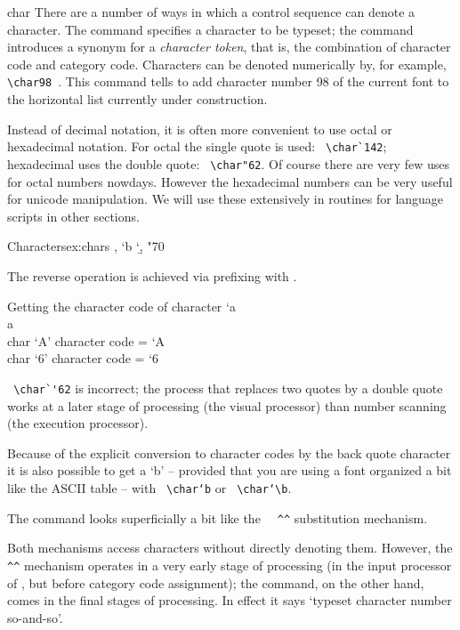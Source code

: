 \begin{docCommand}{char}{}
There are a number of ways in which a control sequence can denote a character. The  command specifies a character to be typeset; the \cmd{\let} command introduces a synonym for a \emph{character
token}, that is, the combination of character code and category code.
\index{\string\char}
Characters can be denoted numerically by, for example, \verb+ \char98 +. This command tells \tex to add
character number 98 of the current font to the horizontal list currently under construction.

Instead of decimal notation, it is often more convenient to use octal or hexadecimal notation. For
octal the single quote is used: \verb+ \char`142+; hexadecimal uses the double quote: \verb+ \char"62+. Of course there are very few uses for octal numbers nowdays. However the hexadecimal numbers can be very useful for unicode manipulation. We will use these extensively in routines for language scripts in other sections.

\end{docCommand}

\begin{texexample}{Characters}{ex:chars}
, 
\char`b 
\char`\b,
\char"70
\end{texexample}

The reverse operation is achieved via prefixing with . 

\begin{texexample}{Getting the character code of character}{}
\number`a \\
\meaning a \\
\def\charnum#1{char `#1'  character code = \number`#1}
\charnum A\\
\charnum 6
\end{texexample}

\verb+ \char`'62+  is incorrect; the process that replaces two quotes by a double quote works at a later
stage of processing (the visual processor) than number scanning (the execution processor).

Because of the explicit conversion to character codes by the back quote character it is also possible
to get a ‘b’ – provided that you are using a font organized a bit like the ASCII table – with \verb+ \char‘b+
or \verb+ \char‘\b+.

The \cmd{\char} command looks superficially a bit like the \verb+  ^^+ substitution mechanism.

Both mechanisms access characters without directly denoting them. However, the \verb+ ^^+ mechanism
operates in a very early stage of processing (in the input processor of \tex, but before category
code assignment); the \cmd{\char} command, on the other hand, comes in the final stages of processing.
In effect it says ‘typeset character number so-and-so’.

